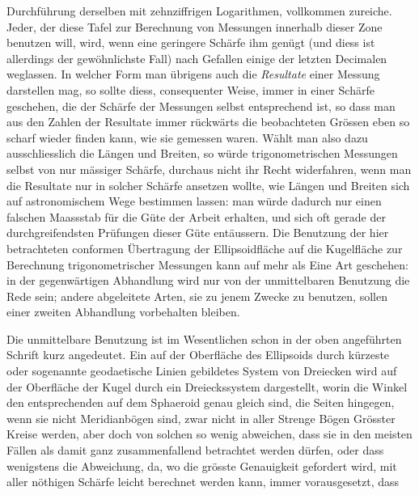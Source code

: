 %
Durchführung derselben mit zehnziffrigen Logarithmen, vollkommen zureiche. Jeder, der diese Tafel zur Berechnung von Messungen innerhalb dieser Zone benutzen will, wird, wenn eine geringere Schärfe ihm genügt (und diess ist allerdings der gewöhnlichste Fall) nach Gefallen einige der letzten Decimalen weglassen. In welcher Form man übrigens auch die \textit{Resultate} einer Messung darstellen mag, so sollte diess, consequenter Weise, immer in einer Schärfe geschehen, die der Schärfe der Messungen selbst entsprechend ist, so dass man aus den Zahlen der Resultate immer rückwärts die beobachteten Grössen eben so scharf wieder finden kann, wie sie gemessen waren. Wählt man also dazu ausschliesslich die Längen und Breiten, so würde trigonometrischen Messungen selbst von nur mässiger Schärfe, durchaus nicht ihr Recht widerfahren, wenn man die Resultate nur in solcher Schärfe ansetzen wollte, wie Längen und Breiten sich auf astronomischem Wege bestimmen lassen: man würde dadurch nur einen falschen Maassstab für die Güte der Arbeit erhalten, und sich oft gerade der durchgreifendsten Prüfungen dieser Güte entäussern.
\indent Die Benutzung der hier betrachteten conformen Übertragung der Ellipsoidfläche auf die Kugelfläche zur Berechnung trigonometrischer Messungen kann auf mehr als Eine Art geschehen: in der gegenwärtigen Abhandlung wird nur von der unmittelbaren Benutzung die Rede sein; andere abgeleitete Arten, sie zu jenem Zwecke zu benutzen, sollen einer zweiten Abhandlung vorbehalten bleiben.

Die unmittelbare Benutzung ist im Wesentlichen schon in der oben angeführten Schrift kurz angedeutet. Ein auf der Oberfläche des Ellipsoids durch kürzeste oder sogenannte geodaetische Linien gebildetes System von Dreiecken wird auf der Oberfläche der Kugel durch ein Dreieckssystem dargestellt, worin die Winkel den entsprechenden auf dem Sphaeroid genau gleich sind, die Seiten hingegen, wenn sie nicht Meridianbögen sind, zwar nicht in aller Strenge Bögen Grösster Kreise werden, aber doch von solchen so wenig abweichen, dass sie in den meisten Fällen als damit ganz zusammenfallend betrachtet werden dürfen, oder dass wenigstens die Abweichung, da, wo die grösste Genauigkeit gefordert wird, mit aller nöthigen Schärfe leicht berechnet werden kann, immer vorausgesetzt, dass
